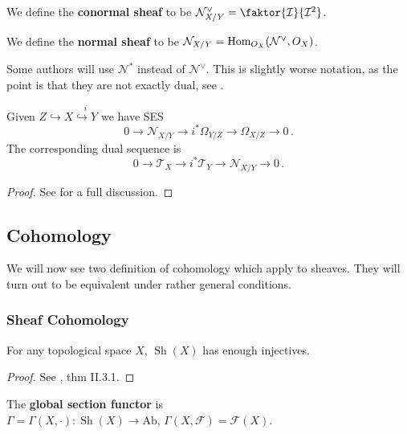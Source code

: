 \documentclass{article}
\begin{document}
\begin{definition}
	We define the \textbf{conormal sheaf} to be $\mathcal{N}^\vee_{X/Y} = \faktor{\mathcal{I}}{\mathcal{I}^2}$.
\end{definition}
\begin{definition}
	We define the \textbf{normal sheaf} to be $\mathcal{N}_{X/Y} = \operatorname{Hom}_{O_X} (\mathcal{N}^\vee,O_X)$. 
\end{definition}
\begin{remark}
	Some authors will use $\mathcal{N}^\ast$ instead of $\mathcal{N}^\vee$. This is slightly worse notation, as the point is that they are not exactly dual, see \cite{Vakil2010}.
\end{remark}

\begin{prop}
	Given $Z \hookrightarrow X \overset{i}{\hookrightarrow Y}$ we have SES
	\[
	0 \to \mathcal{N}_{X/Y} \to i^\ast \Omega_{Y/Z} \to \Omega_{X/Z} \to 0 \, .
	\]
	The corresponding dual sequence is 
	\[
	0 \to \mathcal{T}_X \to i^\ast \mathcal{T}_Y \to \mathcal{N}_{X/Y} \to 0 \, .
	\]
\end{prop}
\begin{proof}
	See \cite{Vakil2010} for a full discussion. 
\end{proof}
\subsection{Cohomology}\label{subsec: cohomology of sheaves}
We will now see two definition of cohomology which apply to sheaves. They will turn out to be equivalent under rather general conditions. 
\subsubsection{Sheaf Cohomology}

\begin{lemma}
	For any topological space $X$, $\operatorname{Sh}(X)$ has enough injectives. 
\end{lemma}
\begin{proof}
	See \cite{Iversen1984}, thm II.3.1. 
\end{proof}

\begin{definition}
	The \textbf{global section functor} is $\Gamma = \Gamma(X,\cdot):\operatorname{Sh}(X) \to \text{Ab}, \, \Gamma(X,\mathcal{F}) = \mathcal{F}(X)$. 
\end{definition}
\end{document}
